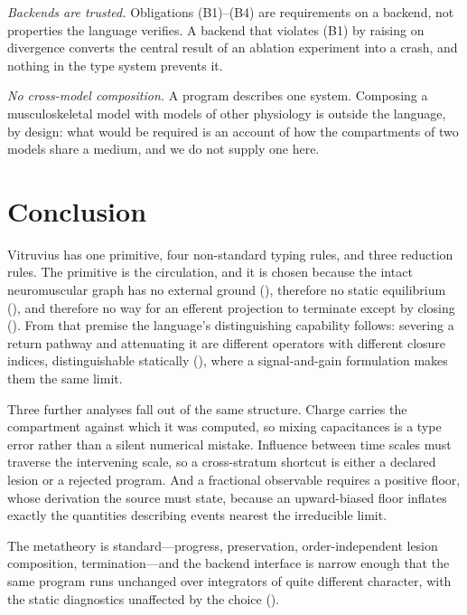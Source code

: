\documentclass[11pt,twocolumn,a4paper]{article}
\theoremstyle{thmstyle}
\theoremstyle{definition}
\theoremstyle{remark}
\begin{document}
\emph{Backends are trusted.} Obligations (B1)--(B4) are requirements on a
backend, not properties the language verifies. A backend that violates (B1) by
raising on divergence converts the central result of an ablation experiment
into a crash, and nothing in the type system prevents it.

\emph{No cross-model composition.} A program describes one system. Composing a
musculoskeletal model with models of other physiology is outside the language,
by design: what would be required is an account of how the compartments of two
models share a medium, and we do not supply one here.

\section{Conclusion}
\label{sec:conclusion}

Vitruvius has one primitive, four non-standard typing rules, and three
reduction rules. The primitive is the circulation, and it is chosen because
the intact neuromuscular graph has no external ground
(), therefore no static equilibrium
(), and therefore no way for an efferent projection
to terminate except by closing (). From that
premise the language's distinguishing capability follows: severing a return
pathway and attenuating it are different operators with different closure
indices, distinguishable statically (), where a
signal-and-gain formulation makes them the same limit.

Three further analyses fall out of the same structure. Charge carries the
compartment against which it was computed, so mixing capacitances is a type
error rather than a silent numerical mistake. Influence between time scales
must traverse the intervening scale, so a cross-stratum shortcut is either a
declared lesion or a rejected program. And a fractional observable requires a
positive floor, whose derivation the source must state, because an
upward-biased floor inflates exactly the quantities describing events nearest
the irreducible limit.

The metatheory is standard---progress, preservation, order-independent lesion
composition, termination---and the backend interface is narrow enough that the
same program runs unchanged over integrators of quite different character,
with the static diagnostics unaffected by the choice
().
\end{document}
